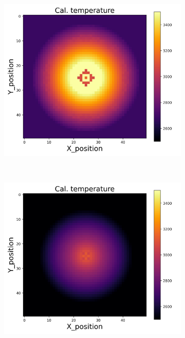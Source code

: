 {\begin{figure}[h]
\begin{minipage}{\textwidth}
\begin{subfigure}{0.27\textwidth}
        \end{subfigure}
        \begin{subfigure}{0.27\textwidth}
            \centering
            \includegraphics[width=\textwidth]{figures/raw_data/21/T3500/lin_square/T_cal.jpg}
        \end{subfigure}
    \end{minipage}\\
    \begin{minipage}{\textwidth}
        \centering
        \begin{subfigure}{0.27\textwidth}
            \centering
            \includegraphics[width=\textwidth]{figures/raw_data/22/T3500/lin_square/T_cal.jpg}

\end{subfigure}
\end{minipage}
\end{figure}}
